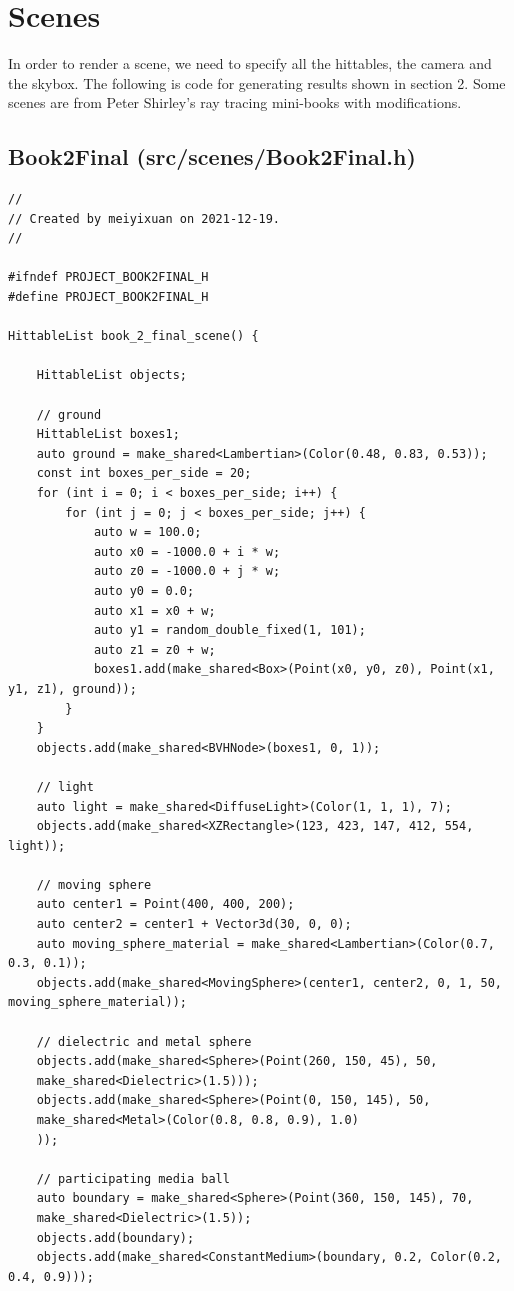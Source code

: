 \documentclass[utf8]{article}
\begin{document}
\section{Scenes}
In order to render a scene, we need to specify all the hittables, the camera and the skybox. The following is code for generating results shown in section 2. Some scenes are from Peter Shirley's ray tracing mini-books with modifications.
\subsection{Book2Final (src/scenes/Book2Final.h)}
\begin{lstlisting}[style=CStyle]
//
// Created by meiyixuan on 2021-12-19.
//

#ifndef PROJECT_BOOK2FINAL_H
#define PROJECT_BOOK2FINAL_H

HittableList book_2_final_scene() {
	
	HittableList objects;
	
	// ground
	HittableList boxes1;
	auto ground = make_shared<Lambertian>(Color(0.48, 0.83, 0.53));
	const int boxes_per_side = 20;
	for (int i = 0; i < boxes_per_side; i++) {
		for (int j = 0; j < boxes_per_side; j++) {
			auto w = 100.0;
			auto x0 = -1000.0 + i * w;
			auto z0 = -1000.0 + j * w;
			auto y0 = 0.0;
			auto x1 = x0 + w;
			auto y1 = random_double_fixed(1, 101);
			auto z1 = z0 + w;
			boxes1.add(make_shared<Box>(Point(x0, y0, z0), Point(x1, y1, z1), ground));
		}
	}
	objects.add(make_shared<BVHNode>(boxes1, 0, 1));
	
	// light
	auto light = make_shared<DiffuseLight>(Color(1, 1, 1), 7);
	objects.add(make_shared<XZRectangle>(123, 423, 147, 412, 554, light));
	
	// moving sphere
	auto center1 = Point(400, 400, 200);
	auto center2 = center1 + Vector3d(30, 0, 0);
	auto moving_sphere_material = make_shared<Lambertian>(Color(0.7, 0.3, 0.1));
	objects.add(make_shared<MovingSphere>(center1, center2, 0, 1, 50, moving_sphere_material));
	
	// dielectric and metal sphere
	objects.add(make_shared<Sphere>(Point(260, 150, 45), 50,
	make_shared<Dielectric>(1.5)));
	objects.add(make_shared<Sphere>(Point(0, 150, 145), 50,
	make_shared<Metal>(Color(0.8, 0.8, 0.9), 1.0)
	));
	
	// participating media ball
	auto boundary = make_shared<Sphere>(Point(360, 150, 145), 70,
	make_shared<Dielectric>(1.5));
	objects.add(boundary);
	objects.add(make_shared<ConstantMedium>(boundary, 0.2, Color(0.2, 0.4, 0.9)));
	

\end{lstlisting}
\end{document}
